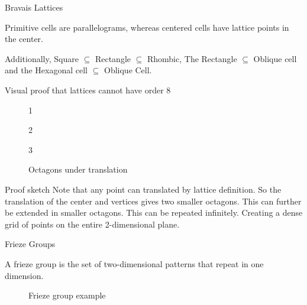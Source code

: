 \documentclass{beamer}
\theoremstyle{definition}
\begin{document}
\begin{frame}{Bravais Lattices}
    \begin{minipage}{0.35\textwidth}
        Primitive cells are parallelograms, whereas centered cells have lattice points in the center.

        Additionally, Square $\subseteq$ Rectangle $\subseteq$ Rhombic,
        The Rectangle $\subseteq$ Oblique cell and the Hexagonal cell $\subseteq$ Oblique Cell.
    \end{minipage}
    \hfill
    \begin{minipage}{0.6\textwidth}
        \centering
        \scalebox{0.6}{}
        \label{fig:lattice}
    \end{minipage}
\end{frame}
\begin{frame}{Visual proof that lattices cannot have order 8}
\begin{figure}
    \centering
    \begin{minipage}{0.3\textwidth}
        \scalebox{0.5}{}
        \caption{1}
    \end{minipage}
    \hfill
    \begin{minipage}{0.3\textwidth}
        \scalebox{0.5}{}
        \caption{2}
    \end{minipage}
    \hfill
    \begin{minipage}{0.3\textwidth}
        \scalebox{0.5}{}
        \caption{3}
    \end{minipage}
    \caption{Octagons under translation}
    \label{fig:enter-label}
\end{figure}
    \begin{block}{Proof sketch}
        Note that any point can translated by lattice definition. So the translation of the center and vertices gives two smaller octagons. This can further be extended in smaller octagons. This can be repeated infinitely. Creating a dense grid of points on the entire 2-dimensional plane.
    \end{block}
\end{frame}

\begin{frame}{Frieze Groups}
    \begin{definition}
        A frieze group is the set of two-dimensional patterns that repeat in one dimension. \cite{Ganapathy:2021}
    \end{definition}
    \begin{figure}
        \centering
        
        \caption{Frieze group example}
        \label{fig:enter-label}
    \end{figure}
\end{frame}
\end{document}
